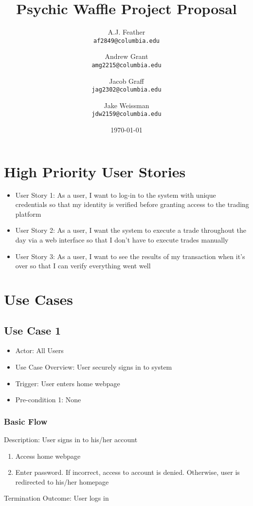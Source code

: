 \documentclass{article}
\title{Psychic Waffle Project Proposal}
\author{
    A.J. Feather\\
    \texttt{af2849@columbia.edu}
    \and
    Andrew Grant\\
    \texttt{amg2215@columbia.edu}
    \and
    Jacob Graff\\
    \texttt{jag2302@columbia.edu}
    \and
    Jake Weissman\\
    \texttt{jdw2159@columbia.edu}
}
\date{\today}
\begin{document}
\maketitle

\section{High Priority User Stories}
\begin{itemize}
\item User Story 1: As a user, I want to log-in to the system with unique credentials so that my identity is verified before granting access to the trading platform
\item User Story 2: As a user, I want the system to execute a trade throughout the day via a web interface so that I don't have to execute trades manually
\item User Story 3: As a user, I want to see the results of my transaction when it's over so that I can verify everything went well
\end{itemize}

\section{Use Cases}

\subsection{Use Case 1}
\begin{itemize}
\item Actor: All Users
\item Use Case Overview: User securely signs in to system
\item Trigger: User enters home webpage
\item Pre-condition 1: None
\end{itemize}

\subsubsection{Basic Flow}
Description: User signs in to his/her account
\begin{enumerate}
\item Access home webpage
\item Enter password. If incorrect, access to account is denied. Otherwise, user is redirected to his/her homepage
\end{enumerate}
Termination Outcome: User logs in
\end{document}

